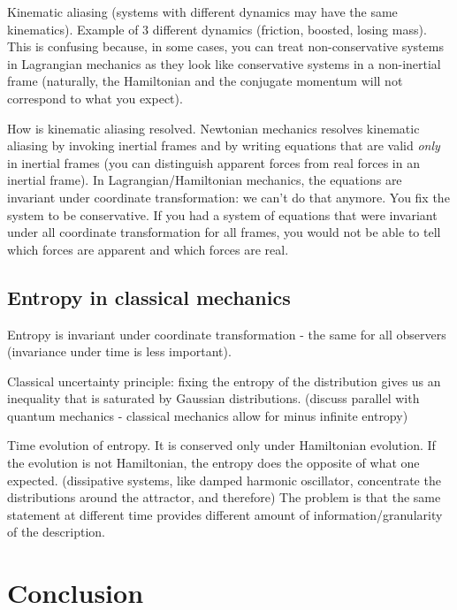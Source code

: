 \documentclass{article}
\begin{document}
Kinematic aliasing (systems with different dynamics may have the same kinematics). Example of 3 different dynamics (friction, boosted, losing mass). This is confusing because, in some cases, you can treat non-conservative systems in Lagrangian mechanics as they look like conservative systems in a non-inertial frame (naturally, the Hamiltonian and the conjugate momentum will not correspond to what you expect).

How is kinematic aliasing resolved. Newtonian mechanics resolves kinematic aliasing by invoking inertial frames and by writing equations that are valid \emph{only} in inertial frames (you can distinguish apparent forces from real forces in an inertial frame).  In Lagrangian/Hamiltonian mechanics, the equations are invariant under coordinate transformation: we can't do that anymore. You fix the system to be conservative. If you had a system of equations that were invariant under all coordinate transformation for all frames, you would not be able to tell which forces are apparent and which forces are real.

\subsection{Entropy in classical mechanics}

Entropy is invariant under coordinate transformation - the same for all observers (invariance under time is less important).

Classical uncertainty principle: fixing the entropy of the distribution gives us an inequality that is saturated by Gaussian distributions. (discuss parallel with quantum mechanics - classical mechanics allow for minus infinite entropy)

Time evolution of entropy. It is conserved only under Hamiltonian evolution. If the evolution is not Hamiltonian, the entropy does the opposite of what one expected. (dissipative systems, like damped harmonic oscillator, concentrate the distributions around the attractor, and therefore) The problem is that the same statement at different time provides different amount of information/granularity of the description.


\section{Conclusion}
	
\end{document}
